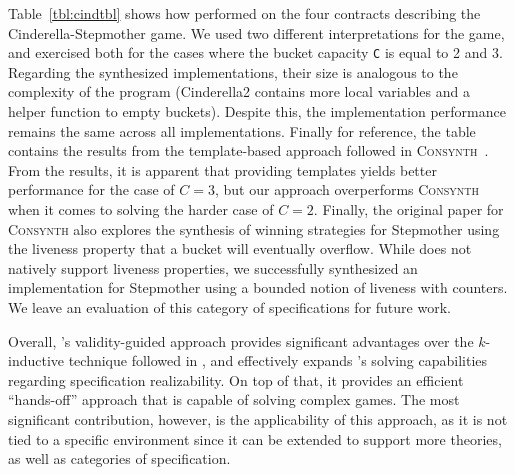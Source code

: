 Table~\ref{tbl:cindtbl} shows how \jsynvg performed on the four contracts describing the Cinderella-Stepmother game. We used two different interpretations for the game, and exercised both for the cases where the bucket capacity  \texttt{C} is equal to 2 and 3. Regarding the synthesized implementations, their size is analogous to the complexity of the program (Cinderella2 contains more local variables and a helper function to empty buckets). Despite this, the implementation performance remains the same across all implementations. Finally for reference, the table contains the results from the template-based approach followed in \textsc{Consynth}~\cite{beyene2014constraint}. From the results, it is apparent that providing templates yields better performance for the case of $C = 3$, but our approach overperforms \textsc{Consynth} when it comes to solving the harder case of $C = 2$. Finally, the original paper for \textsc{Consynth} also explores the synthesis of winning strategies for Stepmother using the liveness property that a bucket will eventually overflow. While \jkind does not natively support liveness properties, we successfully synthesized an implementation for Stepmother using a bounded notion of liveness with counters. We leave an evaluation of this category of specifications for future work.

Overall, \jsynvg's validity-guided approach provides significant advantages
over the $k$-inductive technique followed in \jsyn, and effectively expands
\jkind's solving capabilities regarding specification realizability. On top of that, it provides an efficient ``hands-off'' approach that is capable of solving complex games.
The most significant contribution, however, is the applicability of this approach, as it is not tied to a specific environment since it can be extended to support more
theories, as well as categories of specification. 

